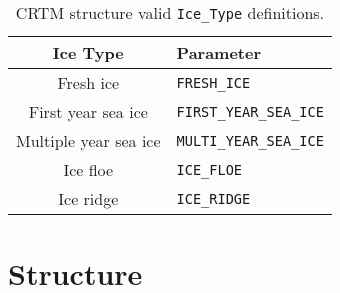 \begin{table}[htp]
  \centering
  \begin{tabular}{c l}
    \hline
    \sffamily\textbf{Ice Type} & \sffamily\textbf{Parameter} \\
    \hline\hline
            Fresh ice        &   \texttt{FRESH\_ICE} \\       
        First year sea ice   &   \texttt{FIRST\_YEAR\_SEA\_ICE} \\
      Multiple year sea ice  &   \texttt{MULTI\_YEAR\_SEA\_ICE} \\
            Ice floe         &   \texttt{ICE\_FLOE} \\            
            Ice ridge        &   \texttt{ICE\_RIDGE} \\           
    \hline
  \end{tabular}
  \caption{CRTM \Surface{} structure valid \texttt{Ice\_Type} definitions.}
  \label{tab:surface_ice_type}
\end{table}

\clearpage

















\clearpage
\section{\SensorData{} Structure}
\label{sec:sensordata_structure}




